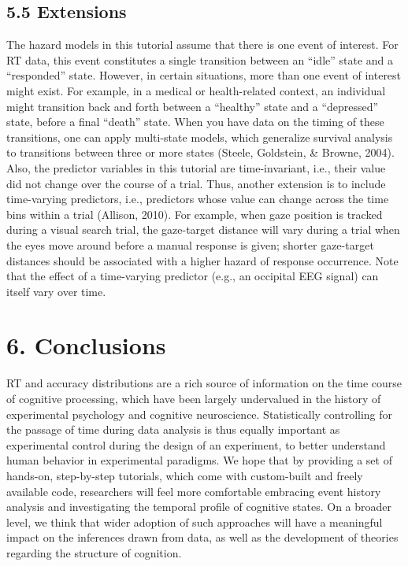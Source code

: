 \documentclass[
  man,floatsintext]{apa6}
\begin{document}
\subsection{5.5 Extensions}\label{extensions}

The hazard models in this tutorial assume that there is one event of interest. For RT data, this event constitutes a single transition between an ``idle'' state and a ``responded'' state. However, in certain situations, more than one event of interest might exist. For example, in a medical or health-related context, an individual might transition back and forth between a ``healthy'' state and a ``depressed'' state, before a final ``death'' state. When you have data on the timing of these transitions, one can apply multi-state models, which generalize survival analysis to transitions between three or more states (Steele, Goldstein, \& Browne, 2004).
Also, the predictor variables in this tutorial are time-invariant, i.e., their value did not change over the course of a trial. Thus, another extension is to include time-varying predictors, i.e., predictors whose value can change across the time bins within a trial (Allison, 2010). For example, when gaze position is tracked during a visual search trial, the gaze-target distance will vary during a trial when the eyes move around before a manual response is given; shorter gaze-target distances should be associated with a higher hazard of response occurrence. Note that the effect of a time-varying predictor (e.g., an occipital EEG signal) can itself vary over time.

\section{6. Conclusions}\label{conclusions}

RT and accuracy distributions are a rich source of information on the time course of cognitive processing, which have been largely undervalued in the history of experimental psychology and cognitive neuroscience. Statistically controlling for the passage of time during data analysis is thus equally important as experimental control during the design of an experiment, to better understand human behavior in experimental paradigms. We hope that by providing a set of hands-on, step-by-step tutorials, which come with custom-built and freely available code, researchers will feel more comfortable embracing event history analysis and investigating the temporal profile of cognitive states. On a broader level, we think that wider adoption of such approaches will have a meaningful impact on the inferences drawn from data, as well as the development of theories regarding the structure of cognition.
\end{document}
